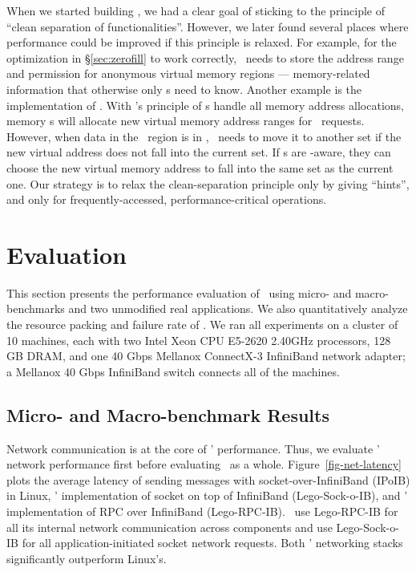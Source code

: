 \documentclass[10pt,times,twocolumn]{z2-article}
\begin{document}
{{{{{{{When we started building \lego, we had a clear goal of sticking to
the principle of ``clean separation of functionalities''.
However, we later found several places where performance could be improved 
if this principle is relaxed.
For example, for the optimization in \S\ref{sec:zerofill} to work correctly,
\pcomponent\ needs to store the address range and permission for anonymous virtual memory regions --- 
memory-related information that otherwise only \mcomponent{}s need to know.
Another example is the implementation of \mremap.
With \lego's principle of \mcomponent{}s handle all memory address allocations,
memory \microos{}s will allocate new virtual memory address ranges for \mremap\ requests.
However, when data in the \mremap\ region is in \excache, 
\lego\ needs to move it to another set if the new virtual address does not fall into the 
current set.
If \mcomponent{}s are \excache-aware, they can choose the new virtual memory address
to fall into the same set as the current one.
Our strategy is to relax the clean-separation principle only by giving ``hints'', 
and only for frequently-accessed,
performance-critical operations.
\section{Evaluation}
\label{sec:results}

This section presents the performance evaluation of \lego\ using micro- and macro-benchmarks and two unmodified real applications.
We also quantitatively analyze the resource packing and failure rate of \lego.
We ran all experiments on a cluster of 10 machines, each with two Intel Xeon CPU E5-2620 2.40GHz
processors, 128 GB DRAM, and one 40 Gbps Mellanox ConnectX-3 InfiniBand network adapter;
a Mellanox 40 Gbps InfiniBand switch connects all of the machines. 

\subsection{Micro- and Macro-benchmark Results}
Network communication is at the core of \lego' performance.
Thus, we evaluate \lego' network performance first before evaluating \lego\ as a whole.
Figure~\ref{fig-net-latency} plots the average latency of sending messages with socket-over-InfiniBand (IPoIB) in Linux,
\lego' implementation of socket on top of InfiniBand (Lego-Sock-o-IB), and \lego' implementation of RPC over InfiniBand (Lego-RPC-IB).
\lego\ use Lego-RPC-IB for all its internal network communication across components and use Lego-Sock-o-IB for 
all application-initiated socket network requests.
Both \lego' networking stacks significantly outperform Linux's.

}}}}}}}
\end{document}
